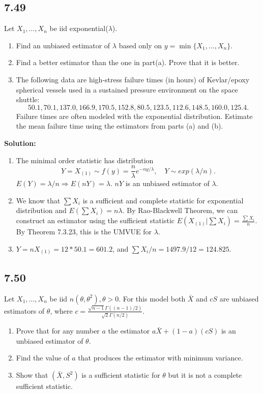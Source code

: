 \documentclass[11pt]{article}
\newcommand{\Sol}{\par {\bf Solution:}}
\newcommand{\sample}[1]{#1_1 , \dots , #1_n}
\begin{document}
\subsection*{7.49}
Let $\sample X$ be iid exponential($\lambda$).
\begin{enumerate}[label=(\alph*)]
    \item Find an unbiased estimator of $\lambda$ based only on $y = \min\{\sample X\}$.
    \item Find a better estimator than the one in part(a). Prove that it is better.
    \item The following data are high-stress failure times (in hours) of Kevlar/epoxy spherical vessels used in a sustained pressure environment on the space shuttle:
    \[
    50.1, 70.1, 137.0, 166.9, 170.5, 152.8, 80.5, 123.5, 112.6, 148.5, 160.0, 125.4.
    \]
    Failure times are often modeled with the exponential distribution. Estimate the mean failure time using the estimators from parts (a) and (b).
\end{enumerate}

\Sol
\begin{enumerate}[label=(\alph*)]
    \item
    The minimal order statistic has distribution
    \[
    Y = X_{(1)} \sim f(y) = \frac{n}{\lambda}e^{-ny/\lambda}, \quad Y \sim exp(\lambda/n).
    \]
    $E(Y) = \lambda/n \Longrightarrow E(nY) = \lambda$.
    $nY$ is an unbiased estimator of $\lambda$.
    
    \item
     We know that  $\sum X_i$ is a sufficient and complete statistic for exponential distribution and $E(\sum X_i) = n\lambda$. By Rao-Blackwell Theorem, we can construct an estimator using the sufficient statistic $E(X_{(1)}|\sum X_i) = \frac{\sum X_i}{n}$. By Theorem 7.3.23, this is the UMVUE for $\lambda$.
     
    \item
    $Y = nX_{(1)} = 12*50.1=601.2$, and $\sum X_i / n = 1497.9/12 = 124.825$.
\end{enumerate}

\subsection*{7.50}
Let $\sample X$ be iid $n(\theta, \theta^2), \theta > 0$. For this model both $\bar X$ and $cS$ are unbiased estimators of $\theta$, where $c = \frac{\sqrt{n-1}\Gamma((n-1)/2)}{\sqrt{2}\Gamma(n/2)}$.
\begin{enumerate}[label=(\alph*)]
    \item Prove that for any number $a$ the estimator $a \bar X + (1-a)(cS)$ is an unbiased estimator of $\theta$.
    \item Find the value of $a$ that produces the estimator with minimum variance.
    \item Show that $(\bar X, S^2)$ is a sufficient statistic for $\theta$ but it is not a complete sufficient statistic.
\end{enumerate}
\end{document}
